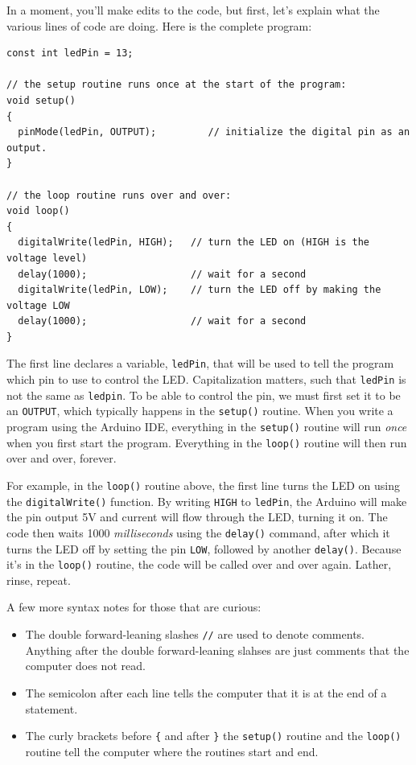 \documentclass[11pt]{article} %
\begin{document}

In a moment, you’ll make edits to the code, but first, let’s explain what the various lines of code are doing. Here is the complete program:


\begin{verbatim}
const int ledPin = 13;

// the setup routine runs once at the start of the program:
void setup() 
{                
  pinMode(ledPin, OUTPUT);         // initialize the digital pin as an output.
}

// the loop routine runs over and over:
void loop() 
{
  digitalWrite(ledPin, HIGH);   // turn the LED on (HIGH is the voltage level)
  delay(1000);                  // wait for a second
  digitalWrite(ledPin, LOW);    // turn the LED off by making the voltage LOW
  delay(1000);                  // wait for a second
}
\end{verbatim}

The first line declares a variable, \verb|ledPin|, that will be used to tell the program which pin to use to control the LED. Capitalization matters, such that \verb|ledPin| is not the same as \verb|ledpin|.  To be able to control the pin, we must first set it to be an \verb|OUTPUT|, which typically happens in the \verb|setup()| routine. When you write a program using the Arduino IDE, everything in the \verb|setup()| routine will run \emph{once} when you first start the program. Everything in the \verb|loop()| routine will then run over and over, forever.

For example, in the \verb|loop()| routine above, the first line turns the LED on using the \verb|digitalWrite()| function. By writing \verb|HIGH| to \verb|ledPin|, the Arduino will make the pin output 5V and current will flow through the LED, turning it on. The code then waits 1000 \emph{milliseconds} using the \verb|delay()| command, after which it turns the LED off by setting the pin \verb|LOW|, followed by another \verb|delay()|. Because it’s in the \verb|loop()| routine, the code will be called over and over again. Lather, rinse, repeat. 

A few more syntax notes for those that are curious:
\begin{itemize}
\item The double forward-leaning slashes \verb|//| are used to denote comments. Anything after the double forward-leaning slahses are just comments that the computer does not read.
\item The semicolon after each line tells the computer that it is at the end of a statement.
\item The curly brackets before \verb|{| and after \verb|}| the \verb|setup()| routine and the \verb|loop()| routine tell the computer where the routines start and end.
\end{itemize}
\end{document}
